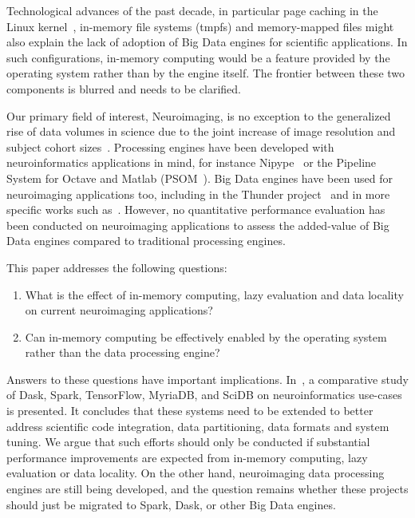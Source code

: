 \documentclass{IEEEtran}
\begin{document}
Technological advances of the past decade, in particular page caching 
in the Linux kernel~\cite{love2010linux}, in-memory file systems 
(tmpfs) and memory-mapped files might also 
explain the lack of adoption of Big Data engines for scientific 
applications. In such configurations, in-memory computing would be a feature 
provided by 
the operating system rather than by the engine itself. The frontier 
between these two components is blurred and needs to be clarified.


Our primary field of interest, Neuroimaging, is no exception to the 
generalized rise of data volumes in science due to the joint increase 
of image resolution and subject cohort sizes~\cite{van2014human}. 
Processing engines have been developed with neuroinformatics 
applications in mind, for instance Nipype~\cite{gorgolewski2011nipype} 
or the Pipeline System for Octave and Matlab 
(PSOM~\cite{bellec2012pipeline}). Big Data engines have been used for 
neuroimaging applications too, including in the Thunder 
project~\cite{freeman2014mapping} and in more specific works such 
as~\cite{makkie2019fast}. However, no quantitative performance 
evaluation has been conducted on neuroimaging applications to assess the 
added-value of Big Data engines compared to traditional processing engines.

This paper addresses the following questions:
\begin{enumerate}
\item What is the effect of in-memory computing, lazy evaluation and data locality on current neuroimaging applications?
\item Can in-memory computing be effectively enabled by the operating system rather than the data processing engine?
\end{enumerate}

Answers to these questions have important implications. 
In~\cite{mehta2017comparative}, a comparative study of Dask, Spark, 
TensorFlow, MyriaDB, and SciDB on neuroinformatics use-cases is 
presented. It concludes that these systems need to be extended to 
better address scientific code integration, data partitioning, data 
formats and system tuning. We argue 
that such efforts should only be conducted if substantial performance 
improvements are expected from in-memory computing, lazy 
evaluation or data 
locality. On the other hand, neuroimaging data processing engines are 
still being developed, and the question remains whether these 
projects should just be migrated to Spark, Dask, or other Big Data 
engines.
\end{document}
